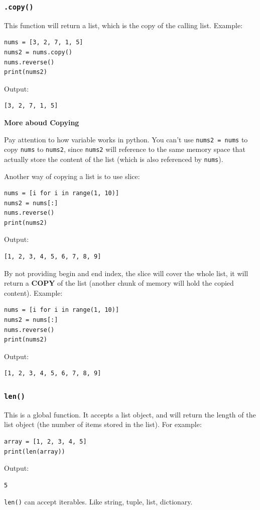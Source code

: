 \documentclass[12pt]{book}
\begin{document}
\subsubsection{\texttt{.copy()}}
\label{sec:orga127bf3}
This function will return a list, which is the copy of the calling list. Example:
\begin{verbatim}
nums = [3, 2, 7, 1, 5]
nums2 = nums.copy()
nums.reverse()
print(nums2)
\end{verbatim}
Output:
\begin{verbatim}
[3, 2, 7, 1, 5]
\end{verbatim}

\textbf{More aboud Copying}

Pay attention to how variable works in python. You can't use \texttt{nums2 = nums} to copy \texttt{nums} to \texttt{nums2}, since \texttt{nums2} will reference to the same memory space that actually store the content of the list (which is also referenced by \texttt{nums}).

Another way of copying a list is to use slice:
\begin{verbatim}
nums = [i for i in range(1, 10)]
nums2 = nums[:]
nums.reverse()
print(nums2)
\end{verbatim}
Output:
\begin{verbatim}
[1, 2, 3, 4, 5, 6, 7, 8, 9]
\end{verbatim}
By not providing begin and end index, the slice will cover the whole list, it will return a \textbf{COPY} of the list (another chunk of memory will hold the copied content). Example:
\begin{verbatim}
nums = [i for i in range(1, 10)]
nums2 = nums[:]
nums.reverse()
print(nums2)
\end{verbatim}
Output:
\begin{verbatim}
[1, 2, 3, 4, 5, 6, 7, 8, 9]
\end{verbatim}
\subsubsection{\texttt{len()}}
\label{sec:org089c9a7}
This is a global function. It accepts a list object, and will return the length of the list object (the number of items stored in the list). For example:
\begin{verbatim}
array = [1, 2, 3, 4, 5]
print(len(array))
\end{verbatim}
Output:
\begin{verbatim}
5
\end{verbatim}
\texttt{len()} can accept iterables. Like string, tuple, list, dictionary.
\end{document}
